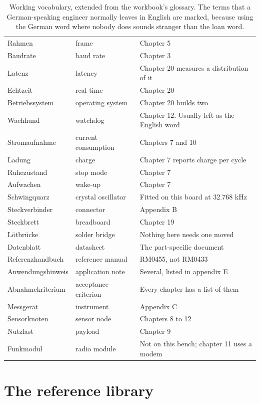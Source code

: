 \begin{table}[H]
\begin{tabular}{p{40mm}p{40mm}p{72mm}}
Rahmen & frame & Chapter 5 \\
Baudrate & baud rate & Chapter 3 \\
Latenz & latency & Chapter 20 measures a distribution of it \\
Echtzeit & real time & Chapter 20 \\
Betriebssystem & operating system & Chapter 20 builds two \\
Wachhund & watchdog & Chapter 12. Usually left as the English word \\
Stromaufnahme & current consumption & Chapters 7 and 10 \\
Ladung & charge & Chapter 7 reports charge per cycle \\
Ruhezustand & stop mode & Chapter 7 \\
Aufwachen & wake-up & Chapter 7 \\
Schwingquarz & crystal oscillator & Fitted on this board at 32.768 kHz \\
Steckverbinder & connector & Appendix B \\
Steckbrett & breadboard & Chapter 19 \\
L\"otbr\"ucke & solder bridge & Nothing here needs one moved \\
Datenblatt & datasheet & The part-specific document \\
Referenzhandbuch & reference manual & RM0455, not RM0433 \\
Anwendungshinweis & application note & Several, listed in appendix E \\
Abnahmekriterium & acceptance criterion & Every chapter has a list of them \\
Messger\"at & instrument & Appendix C \\
Sensorknoten & sensor node & Chapters 8 to 12 \\
Nutzlast & payload & Chapter 9 \\
Funkmodul & radio module & Not on this bench; chapter 11 uses a modem \\
\bottomrule
\end{tabular}
\caption{Working vocabulary, extended from the workbook's glossary. The terms that a German-speaking engineer normally leaves in English are marked, because using the German word where nobody does sounds stranger than the loan word.}
\end{table}

\section{The reference library}

